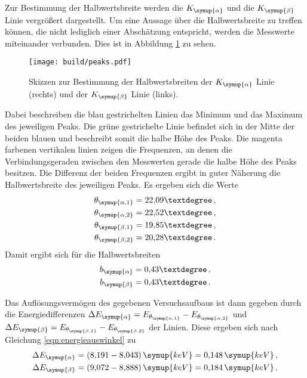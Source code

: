Zur Bestimmung der Halbwertsbreite werden die $K_{\symup{\alpha}}$ und die
$K_{\symup{\beta}}$ Linie vergrößert dargestellt. Um eine Aussage über die
Halbwertsbreite zu treffen können, die nicht lediglich einer Abschätzung entspricht,
werden die Messwerte miteinander verbunden. Dies ist in Abbildung \ref{fig:hbreite}
zu sehen.

\begin{figure}
  \centering
  \texttt{[image: build/peaks.pdf]}
  \caption{Skizzen zur Bestimmung der Halbwertsbreiten der $K_{\symup{\alpha}}$
  Linie (rechts) und der $K_{\symup{\beta}}$ Linie (links).}
  \label{fig:hbreite}
\end{figure}

Dabei beschreiben die blau gestrichelten Linien das Minimum und das Maximum des
jeweiligen Peaks. Die grüne gestrichelte Linie befindet sich in der Mitte der
beiden blauen und beschreibt somit die halbe Höhe des Peaks. Die magenta farbenen
vertikalen linien zeigen die Frequenzen, an denen die Verbindungsgeraden zwischen
den Messwerten gerade die halbe Höhe des Peaks besitzen. Die Differenz der beiden
Frequenzen ergibt in guter Näherung die Halbwertsbreite des jeweiligen Peaks.
Es ergeben sich die Werte
\begin{align*}
  \theta_{\symup{\alpha,1}}=22{,}09° \,, \\
  \theta_{\symup{\alpha,2}}=22{,}52° \,, \\
  \theta_{\symup{\beta,1}}=19{,}85° \,, \\
  \theta_{\symup{\beta,2}}=20{,}28° \,.
\end{align*}
Damit ergibt sich für die Halbwertsbreiten
\begin{align*}
  b_{\symup{\alpha}}=0{,}43° \,,\\
  b_{\symup{\beta}}=0{,}43°  \,.
\end{align*}

Das Auflösungsvermögen des gegebenen Versuchsaufbaus ist dann gegeben durch die
Energiedifferenzen $\Delta E_{\symup{\alpha}}=E_{\theta_{\symup{\alpha,1}}}
-E_{\theta_{\symup{\alpha,2}}}$ und $\Delta E_{\symup{\beta}}=
E_{\theta_{\symup{\beta,1}}}-E_{\theta_{\symup{\beta,2}}}$ der Linien. Diese
ergeben sich nach Gleichung \eqref{eqn:energieauswinkel} zu
\begin{align*}
  \Delta E_{\symup{\alpha}}=(8{,}191-8{,}043)\,\symup{keV}=0{,}148\,\symup{keV} \,, \\
  \Delta E_{\symup{\beta}}=(9{,}072-8{,}888)\,\symup{keV}=0{,}184\,\symup{keV} \,.
\end{align*}


